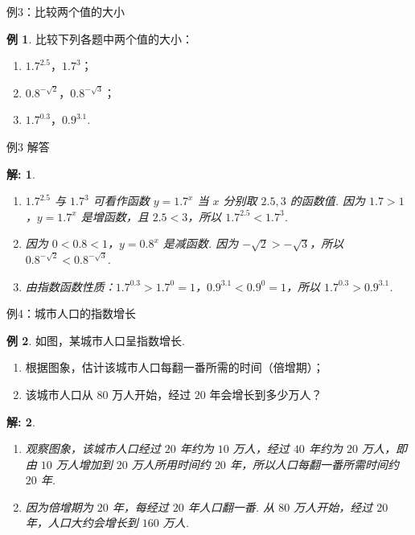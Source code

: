 \documentclass[aspectratio=169,13pt,t] {beamer}
\newtheorem*{solve}{解:}
\theoremstyle{definition}
\newtheorem{exam}{例}
\begin{document}
\begin{frame}{例3：比较两个值的大小}
	\begin{exam}
		比较下列各题中两个值的大小：
		\begin{enumerate}[(1)]
			\item \(1.7^{2.5}\)，\(1.7^{3}\)；
			\item \(0.8^{-\sqrt{2}}\)，\(0.8^{-\sqrt{3}}\)；
			\item \(1.7^{0.3}\)，\(0.9^{3.1}\).
		\end{enumerate}
	\end{exam}
\end{frame}

\begin{frame}{例3 解答}
	\begin{solve}
		\begin{enumerate}[(1)]
			\item \(1.7^{2.5}\) 与 \(1.7^{3}\) 可看作函数 \(y=1.7^x\) 当 \(x\) 分别取 \(2.5,3\) 的函数值. 因为 \(1.7>1\)，\(y=1.7^x\) 是增函数，且 \(2.5<3\)，所以 \(1.7^{2.5}<1.7^{3}\).
			\item 因为 \(0<0.8<1\)，\(y=0.8^x\) 是减函数. 因为 \(-\sqrt{2}>-\sqrt{3}\)，所以 \(0.8^{-\sqrt{2}}<0.8^{-\sqrt{3}}\).
			\item 由指数函数性质：\(1.7^{0.3}>1.7^0=1\)，\(0.9^{3.1}<0.9^0=1\)，所以 \(1.7^{0.3}>0.9^{3.1}\).
		\end{enumerate}
	\end{solve}
\end{frame}

\begin{frame}{例4：城市人口的指数增长}
	\begin{exam}
		如图，某城市人口呈指数增长.
		\begin{enumerate}[(1)]
			\item 根据图象，估计该城市人口每翻一番所需的时间（倍增期）；
			\item 该城市人口从 \(80\) 万人开始，经过 \(20\) 年会增长到多少万人？
		\end{enumerate}
	\end{exam}
	\pause
	\begin{solve}
		\begin{enumerate}[(1)]
			\item 观察图象，该城市人口经过 \(20\) 年约为 \(10\) 万人，经过 \(40\) 年约为 \(20\) 万人，即由 \(10\) 万人增加到 \(20\) 万人所用时间约 \(20\) 年，所以人口每翻一番所需时间约 \(20\) 年.
			\item 因为倍增期为 \(20\) 年，每经过 \(20\) 年人口翻一番. 从 \(80\) 万人开始，经过 \(20\) 年，人口大约会增长到 \(160\) 万人.
		\end{enumerate}
	\end{solve}
\end{frame}
\end{document}
